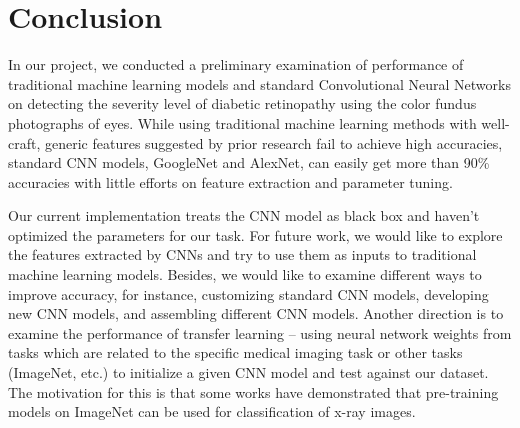 \section{Conclusion}
In our project, we conducted a preliminary examination of performance of traditional machine learning models and standard Convolutional Neural Networks on detecting the severity level of diabetic retinopathy using the color fundus photographs of eyes. While using traditional machine learning methods with well-craft, generic features 
suggested by prior research fail to achieve high accuracies, standard CNN models, GoogleNet and AlexNet, can easily get more than 90\% accuracies with little efforts on feature extraction and parameter tuning. 

Our current implementation treats the CNN model as black box and haven't 
optimized the parameters for our task. For future work, we would like to explore the 
features extracted by CNNs and try to use them as inputs to traditional machine 
learning models. Besides, we would like to examine different ways 
to improve accuracy, for instance, customizing standard CNN models, developing
new CNN models, and assembling different CNN models. Another direction is to 
examine the performance of transfer learning -- using neural network weights from tasks which are related to the specific medical imaging task or other tasks (ImageNet, etc.) to initialize a given CNN model and test against our dataset. 
The motivation for this is that some works have demonstrated that pre-training models  
on ImageNet can be used for classification of x-ray images.  
